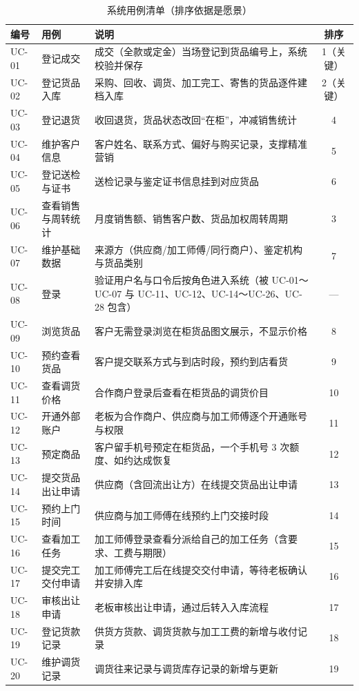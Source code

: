 \begin{table}[H]
\centering
\small
\caption{系统用例清单（排序依据是愿景）}
\begin{tabularx}{\textwidth}{@{}l l Y c@{}}
\toprule
编号 & 用例 & 说明 & 排序 \\
\midrule
UC-01 & 登记成交 & 成交（全款或定金）当场登记到货品编号上，系统校验并保存 & 1（关键） \\
UC-02 & 登记货品入库 & 采购、回收、调货、加工完工、寄售的货品逐件建档入库 & 2（关键） \\
UC-03 & 登记退货 & 收回退货，货品状态改回“在柜”，冲减销售统计 & 4 \\
UC-04 & 维护客户信息 & 客户姓名、联系方式、偏好与购买记录，支撑精准营销 & 5 \\
UC-05 & 登记送检与证书 & 送检记录与鉴定证书信息挂到对应货品 & 6 \\
UC-06 & 查看销售与周转统计 & 月度销售额、销售客户数、货品加权周转周期 & 3 \\
UC-07 & 维护基础数据 & 来源方（供应商/加工师傅/同行商户）、鉴定机构与货品类别 & 7 \\
UC-08 & 登录 & 验证用户名与口令后按角色进入系统（被 UC-01～UC-07 与 UC-11、UC-12、UC-14～UC-26、UC-28 包含） & — \\
UC-09 & 浏览货品 & 客户无需登录浏览在柜货品图文展示，不显示价格 & 8 \\
UC-10 & 预约查看货品 & 客户提交联系方式与到店时段，预约到店看货 & 9 \\
UC-11 & 查看调货价格 & 合作商户登录后查看在柜货品的调货价目 & 10 \\
UC-12 & 开通外部账户 & 老板为合作商户、供应商与加工师傅逐个开通账号与权限 & 11 \\
UC-13 & 预定商品 & 客户留手机号预定在柜货品，一个手机号 3 次额度、如约达成恢复 & 12 \\
UC-14 & 提交货品出让申请 & 供应商（含回流出让方）在线提交货品出让申请 & 13 \\
UC-15 & 预约上门时间 & 供应商与加工师傅在线预约上门交接时段 & 14 \\
UC-16 & 查看加工任务 & 加工师傅登录查看分派给自己的加工任务（含要求、工费与期限） & 15 \\
UC-17 & 提交完工交付申请 & 加工师傅完工后在线提交交付申请，等待老板确认并安排入库 & 16 \\
UC-18 & 审核出让申请 & 老板审核出让申请，通过后转入入库流程 & 17 \\
UC-19 & 登记货款记录 & 供货方货款、调货货款与加工工费的新增与收付记录 & 18 \\
UC-20 & 维护调货记录 & 调货往来记录与调货库存记录的新增与更新 & 19 \\

\end{tabularx}
\end{table}
